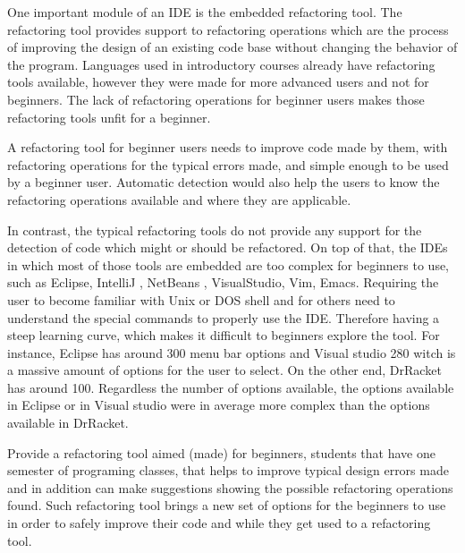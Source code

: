 One important module of an IDE is the embedded refactoring tool. %
The refactoring tool provides support to refactoring operations which are the process of improving the design
of an existing code base \cite{fowler1999refactoring} without changing the behavior of the program.
Languages used in introductory courses already have refactoring tools available,
however they were made for more advanced users and not for beginners.
The lack of refactoring operations for beginner users makes those refactoring tools
unfit for a beginner.

A refactoring tool for beginner users needs to improve code made by them, %
with refactoring operations for the typical errors made, and simple enough to be
used by a beginner user.
Automatic detection would also help the users to know the refactoring operations
available and where they are applicable.

In contrast, the typical refactoring tools do not provide any support for the detection of code which might or should %
be refactored.
On top of that, the IDEs in which most of those tools are embedded are too complex for beginners
to use, such as Eclipse\cite{carlson2005eclipse}, IntelliJ \cite{bock2011intellij}, NetBeans \cite{boudreau2002netbeans},
 VisualStudio, Vim\cite{moolenaar2008vim}, Emacs\cite{stallman2007gnu}.
Requiring the user to become familiar with Unix or DOS shell and for others need to
understand the special commands to properly use the IDE. %
Therefore having a steep learning curve, which makes it difficult to beginners
explore the tool. %
For instance, Eclipse has around 300 menu bar options and Visual studio 280 witch is a massive amount
of options for the user to select.
On the other end, DrRacket has around 100. %
Regardless the number of options available, the options available in Eclipse or
in Visual studio were in average more complex than the options available in DrRacket.

Provide a refactoring tool aimed (made) for beginners, students that have one semester %
of programing classes, that helps to improve typical design errors made and in addition can
make suggestions showing the possible refactoring operations found.
Such refactoring tool brings a new set of options for the beginners to use
in order to safely improve their code and while they get used to a refactoring tool.



